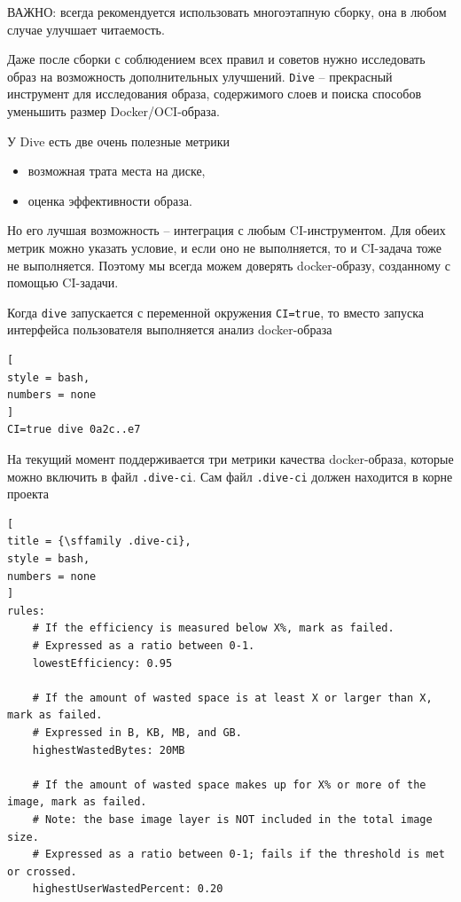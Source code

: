 \documentclass[%
	11pt,
	a4paper,
	utf8,
		]{article}
\begin{document}
ВАЖНО: всегда рекомендуется использовать многоэтапную сборку, она в любом случае улучшает читаемость.

Даже после сборки с соблюдением всех правил и советов нужно исследовать образ на возможность дополнительных улучшений. \texttt{Dive} \url{} -- прекрасный инструмент для исследования образа, содержимого слоев и поиска способов уменьшить размер Docker/OCI-образа.

У Dive есть две очень полезные метрики
\begin{itemize}
	\item возможная трата места на диске,
	
	\item оценка эффективности образа.
\end{itemize}

Но его лучшая возможность -- интеграция с любым CI-инструментом. Для обеих метрик можно указать условие, и если оно не выполняется, то и CI-задача тоже не выполняется. Поэтому мы всегда можем доверять docker-образу, созданному с помощью CI-задачи.

Когда \texttt{dive} запускается с переменной окружения \texttt{CI=true}, то вместо запуска интерфейса пользователя выполняется анализ docker-образа

\begin{lstlisting}[
style = bash,
numbers = none	
]
CI=true dive 0a2c..e7
\end{lstlisting}

На текущий момент поддерживается три метрики качества docker-образа, которые можно включить в файл \texttt{.dive-ci}. Сам файл \texttt{.dive-ci} должен находится в корне проекта
\begin{lstlisting}[
title = {\sffamily .dive-ci},
style = bash,
numbers = none	
]
rules:
	# If the efficiency is measured below X%, mark as failed.
	# Expressed as a ratio between 0-1.
	lowestEfficiency: 0.95

	# If the amount of wasted space is at least X or larger than X, mark as failed.
	# Expressed in B, KB, MB, and GB.
	highestWastedBytes: 20MB

	# If the amount of wasted space makes up for X% or more of the image, mark as failed.
	# Note: the base image layer is NOT included in the total image size.
	# Expressed as a ratio between 0-1; fails if the threshold is met or crossed.
	highestUserWastedPercent: 0.20
\end{lstlisting} 
\end{document}
